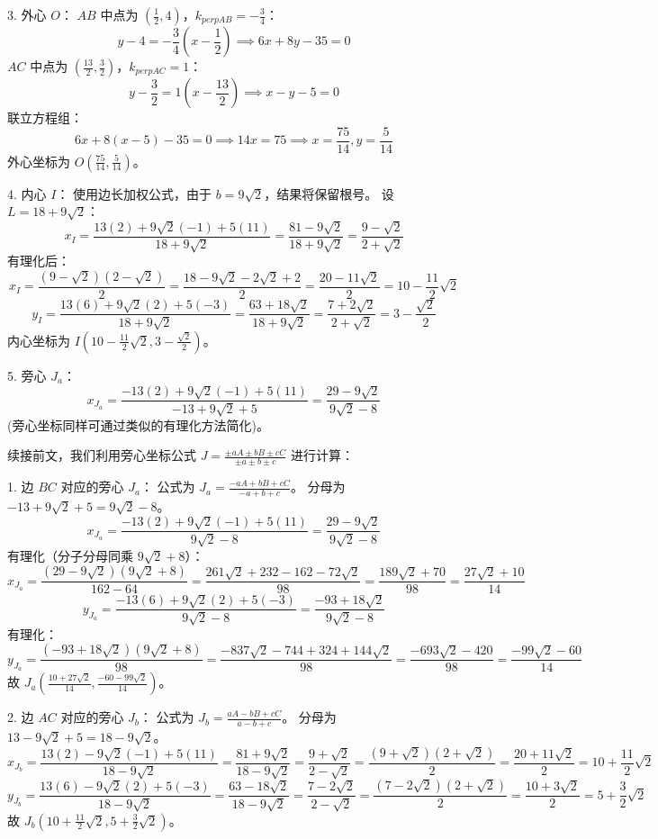 \begin{questions}
\begin{solution}
3. 外心 $O$：
$AB$ 中点为 $(\frac{1}{2}, 4)$，$k_{perpAB} = -\frac{3}{4}$：
\[
y - 4 = -\frac{3}{4}(x - \frac{1}{2}) \implies 6x + 8y - 35 = 0
\]
$AC$ 中点为 $(\frac{13}{2}, \frac{3}{2})$，$k_{perpAC} = 1$：
\[
y - \frac{3}{2} = 1(x - \frac{13}{2}) \implies x - y - 5 = 0
\]
联立方程组：
\[
6x + 8(x - 5) - 35 = 0 \implies 14x = 75 \implies x = \frac{75}{14}, y = \frac{5}{14}
\]
外心坐标为 $O(\frac{75}{14}, \frac{5}{14})$。

4. 内心 $I$：
使用边长加权公式，由于 $b = 9\sqrt{2}$，结果将保留根号。
设 $L = 18 + 9\sqrt{2}$：
\[
x_I = \frac{13(2) + 9\sqrt{2}(-1) + 5(11)}{18 + 9\sqrt{2}} = \frac{81 - 9\sqrt{2}}{18 + 9\sqrt{2}} = \frac{9 - \sqrt{2}}{2 + \sqrt{2}}
\]
有理化后：
\[
x_I = \frac{(9 - \sqrt{2})(2 - \sqrt{2})}{2} = \frac{18 - 9\sqrt{2} - 2\sqrt{2} + 2}{2} = \frac{20 - 11\sqrt{2}}{2} = 10 - \frac{11}{2}\sqrt{2}
\]
\[
y_I = \frac{13(6) + 9\sqrt{2}(2) + 5(-3)}{18 + 9\sqrt{2}} = \frac{63 + 18\sqrt{2}}{18 + 9\sqrt{2}} = \frac{7 + 2\sqrt{2}}{2 + \sqrt{2}} = 3 - \frac{\sqrt{2}}{2}
\]
内心坐标为 $I(10 - \frac{11}{2}\sqrt{2}, 3 - \frac{\sqrt{2}}{2})$。

5. 旁心 $J_a$：
\[
x_{J_a} = \frac{-13(2) + 9\sqrt{2}(-1) + 5(11)}{-13 + 9\sqrt{2} + 5} = \frac{29 - 9\sqrt{2}}{9\sqrt{2} - 8}
\]
(旁心坐标同样可通过类似的有理化方法简化)。
\end{solution}

\begin{solution}
续接前文，我们利用旁心坐标公式 $J = \frac{\pm aA \pm bB \pm cC}{\pm a \pm b \pm c}$ 进行计算：

1. 边 $BC$ 对应的旁心 $J_a$：
公式为 $J_a = \frac{-aA + bB + cC}{-a+b+c}$。
分母为 $-13 + 9\sqrt{2} + 5 = 9\sqrt{2} - 8$。
\[
x_{J_a} = \frac{-13(2) + 9\sqrt{2}(-1) + 5(11)}{9\sqrt{2} - 8} = \frac{29 - 9\sqrt{2}}{9\sqrt{2} - 8}
\]
有理化（分子分母同乘 $9\sqrt{2} + 8$）：
\[
x_{J_a} = \frac{(29 - 9\sqrt{2})(9\sqrt{2} + 8)}{162 - 64} = \frac{261\sqrt{2} + 232 - 162 - 72\sqrt{2}}{98} = \frac{189\sqrt{2} + 70}{98} = \frac{27\sqrt{2} + 10}{14}
\]
\[
y_{J_a} = \frac{-13(6) + 9\sqrt{2}(2) + 5(-3)}{9\sqrt{2} - 8} = \frac{-93 + 18\sqrt{2}}{9\sqrt{2} - 8}
\]
有理化：
\[
y_{J_a} = \frac{(-93 + 18\sqrt{2})(9\sqrt{2} + 8)}{98} = \frac{-837\sqrt{2} - 744 + 324 + 144\sqrt{2}}{98} = \frac{-693\sqrt{2} - 420}{98} = \frac{-99\sqrt{2} - 60}{14}
\]
故 $J_a (\frac{10 + 27\sqrt{2}}{14}, \frac{-60 - 99\sqrt{2}}{14})$。

2. 边 $AC$ 对应的旁心 $J_b$：
公式为 $J_b = \frac{aA - bB + cC}{a-b+c}$。
分母为 $13 - 9\sqrt{2} + 5 = 18 - 9\sqrt{2}$。
\[
x_{J_b} = \frac{13(2) - 9\sqrt{2}(-1) + 5(11)}{18 - 9\sqrt{2}} = \frac{81 + 9\sqrt{2}}{18 - 9\sqrt{2}} = \frac{9 + \sqrt{2}}{2 - \sqrt{2}} = \frac{(9 + \sqrt{2})(2 + \sqrt{2})}{2} = \frac{20 + 11\sqrt{2}}{2} = 10 + \frac{11}{2}\sqrt{2}
\]
\[
y_{J_b} = \frac{13(6) - 9\sqrt{2}(2) + 5(-3)}{18 - 9\sqrt{2}} = \frac{63 - 18\sqrt{2}}{18 - 9\sqrt{2}} = \frac{7 - 2\sqrt{2}}{2 - \sqrt{2}} = \frac{(7 - 2\sqrt{2})(2 + \sqrt{2})}{2} = \frac{10 + 3\sqrt{2}}{2} = 5 + \frac{3}{2}\sqrt{2}
\]
故 $J_b (10 + \frac{11}{2}\sqrt{2}, 5 + \frac{3}{2}\sqrt{2})$。


\end{solution}
\end{questions}
